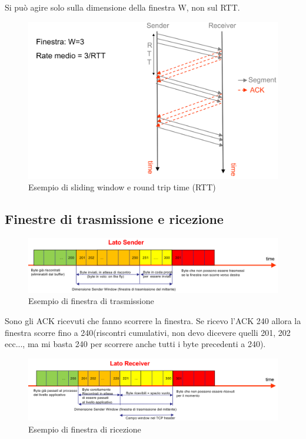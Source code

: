 Si può agire solo sulla dimensione della finestra W, non sul RTT.

\begin{figure}[h!]
    \centering
    \includegraphics[width=1\textwidth]{images/rttsliding.png}
    \caption{Esempio di sliding window e round trip time (RTT)}
    \label{fig:rttsliding}
\end{figure}
\newpage

\subsection{Finestre di trasmissione e ricezione}
\begin{figure}[h!]
    \centering
    \includegraphics[width=1\textwidth]{images/finestratrasmissione.png}
    \caption{Esempio di finestra di trasmissione}
    \label{fig:finestratrasmissione}
\end{figure}

Sono gli ACK ricevuti che fanno scorrere la finestra. Se ricevo l'ACK 240 allora la finestra scorre fino a 240(riscontri cumulativi, non devo dicevere quelli 201, 202 ecc..., ma mi basta 240 per scorrere anche tutti i byte precedenti a 240).




\begin{figure}[h!]
    \centering
    \includegraphics[width=1\textwidth]{images/finestraricezione.png}
    \caption{Esempio di finestra di ricezione}
    \label{fig:finestraricezione}
\end{figure}



